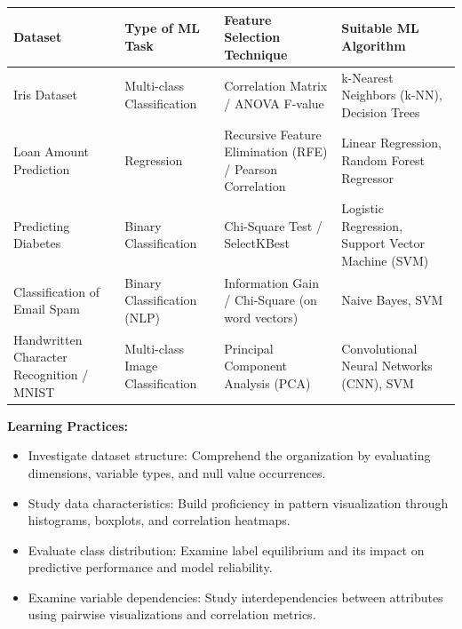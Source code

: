 \documentclass[11pt]{article}
\begin{document}
\begin{table}[H] 
\centering
\vspace{0.5cm}
\renewcommand{\arraystretch}{1.5}
\begin{tabular}{|p{}|p{}|p{}|p{}|}
\hline
\textbf{Dataset} & \textbf{Type of ML Task} & \textbf{Feature Selection Technique} & \textbf{Suitable ML Algorithm} \\ \hline
Iris Dataset & Multi-class Classification & Correlation Matrix / ANOVA F-value & k-Nearest Neighbors (k-NN), Decision Trees \\ \hline
Loan Amount Prediction & Regression & Recursive Feature Elimination (RFE) / Pearson Correlation & Linear Regression, Random Forest Regressor \\ \hline
Predicting Diabetes & Binary Classification & Chi-Square Test / SelectKBest & Logistic Regression, Support Vector Machine (SVM) \\ \hline
Classification of Email Spam & Binary Classification (NLP) & Information Gain / Chi-Square (on word vectors) & Naive Bayes, SVM \\ \hline
Handwritten Character Recognition / MNIST & Multi-class Image Classification & Principal Component Analysis (PCA) & Convolutional Neural Networks (CNN), SVM \\ \hline
\end{tabular}
\end{table}
\vspace{0.5cm}
\noindent
\textbf{Learning Practices:}
\begin{itemize}
    \item Investigate dataset structure: Comprehend the organization by evaluating dimensions, variable types, and null value occurrences.
\item Study data characteristics: Build proficiency in pattern visualization through histograms, boxplots, and correlation heatmaps.
\item Evaluate class distribution: Examine label equilibrium and its impact on predictive performance and model reliability.
\item Examine variable dependencies: Study interdependencies between attributes using pairwise visualizations and correlation metrics.
\end{itemize}

\vspace{0.5cm}
\end{document}
